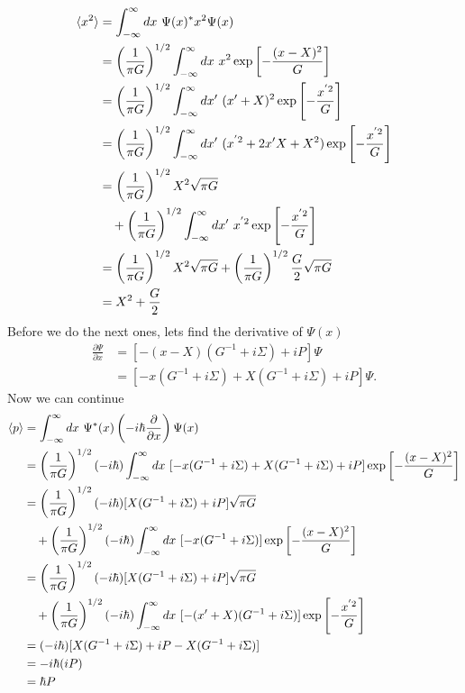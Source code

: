 \documentclass[11pt,letterpaper]{article}
\begin{document}
\begin{enumerate}
\begin{enumerate}
\begin{align*}\braket{x^2} &= \int_{-\infty}^{\infty}{dx\ \Psi(x)^*x^2\Psi(x)}\\
&=\left(\frac{1}{\pi G}\right)^{1/2}\int_{-\infty}^{\infty}{dx\ x^2\exp{\left[-\frac{(x-X)^2}{G}\right]}}\\
&=\left(\frac{1}{\pi G}\right)^{1/2}\int_{-\infty}^{\infty}{dx'\ (x'+X)^2\exp{\left[-\frac{x^{'2}}{G}\right]}}\\
&=\left(\frac{1}{\pi G}\right)^{1/2}\int_{-\infty}^{\infty}{dx'\ (x^{'2}+2x'X+X^2)\exp{\left[-\frac{x^{'2}}{G}\right]}}\\
&=\left(\frac{1}{\pi G}\right)^{1/2}X^2\sqrt{\pi G}\\
&\quad+\left(\frac{1}{\pi G}\right)^{1/2}\int_{-\infty}^{\infty}{dx'\ x^{'2}\exp{\left[-\frac{x^{'2}}{G}\right]}}\\
&=\left(\frac{1}{\pi G}\right)^{1/2}X^2\sqrt{\pi G}+\left(\frac{1}{\pi G}\right)^{1/2}\frac{G}{2}\sqrt{\pi G}\\
&=X^2+\frac{G}{2}
\end{align*}
Before we do the next ones, lets find the derivative of $\Psi(x)$
\begin{align*}\frac{\partial\Psi}{\partial x} &= [-(x-X)(G^{-1}+i\Sigma)+iP]\Psi\\
&=[-x(G^{-1}+i\Sigma)+X(G^{-1}+i\Sigma)+iP]\Psi.
\end{align*}
Now we can continue
\begin{align*}\braket{p} &= \int_{-\infty}^{\infty}{dx\ \Psi^*(x)\left(-i\hbar\frac{\partial}{\partial x}\right)\Psi(x)}\\
&=\left(\frac{1}{\pi G}\right)^{1/2}(-i\hbar)\int_{-\infty}^{\infty}{dx\ [-x(G^{-1}+i\Sigma)+X(G^{-1}+i\Sigma)+iP]\exp{\left[-\frac{(x-X)^2}{G}\right]}}\\
&=\left(\frac{1}{\pi G}\right)^{1/2}(-i\hbar)[X(G^{-1}+i\Sigma)+iP]\sqrt{\pi G}\\
&\quad+\left(\frac{1}{\pi G}\right)^{1/2}(-i\hbar)\int_{-\infty}^{\infty}{dx\ [-x(G^{-1}+i\Sigma)]\exp{\left[-\frac{(x-X)^2}{G}\right]}}\\
&=\left(\frac{1}{\pi G}\right)^{1/2}(-i\hbar)[X(G^{-1}+i\Sigma)+iP]\sqrt{\pi G}\\
&\quad+\left(\frac{1}{\pi G}\right)^{1/2}(-i\hbar)\int_{-\infty}^{\infty}{dx\ [-(x'+X)(G^{-1}+i\Sigma)]\exp{\left[-\frac{x^{'2}}{G}\right]}}\\
&=(-i\hbar)[X(G^{-1}+i\Sigma)+iP-X(G^{-1}+i\Sigma)]\\
&=-i\hbar(iP)\\
&=\hbar P
\end{align*}


\end{enumerate}
\end{enumerate}
\end{document}
